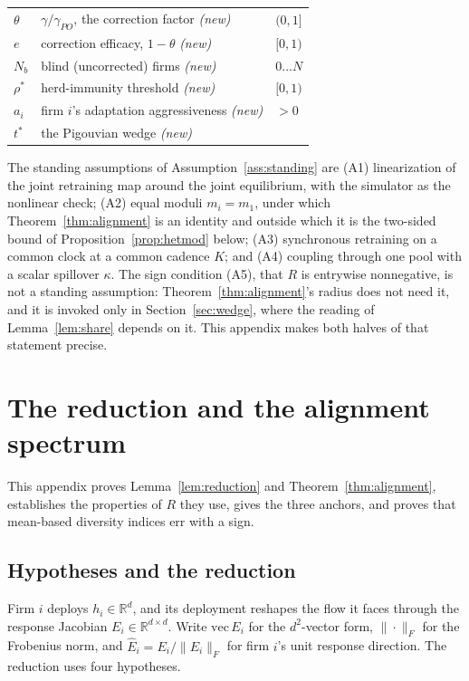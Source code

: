 \begin{center}
\begin{tabular}{lll}
$\theta$ & $\gamma/\gamma_{PO}$, the correction factor \emph{(new)} & $(0,1]$ \\
$e$ & correction efficacy, $1-\theta$ \emph{(new)} & $[0,1)$ \\
$N_b$ & blind (uncorrected) firms \emph{(new)} & $0 \ldots N$ \\
$\rho^\ast$ & herd-immunity threshold \emph{(new)} & $[0,1)$ \\
$a_i$ & firm $i$'s adaptation aggressiveness \emph{(new)} & $>0$ \\
$t^\ast$ & the Pigouvian wedge \emph{(new)} & \\
\bottomrule
\end{tabular}
\end{center}

The standing assumptions of Assumption~\ref{ass:standing} are (A1) linearization of the joint retraining map around the joint equilibrium, with the simulator as the nonlinear check; (A2) equal moduli $m_i = m_1$, under which Theorem~\ref{thm:alignment} is an identity and outside which it is the two-sided bound of Proposition~\ref{prop:hetmod} below; (A3) synchronous retraining on a common clock at a common cadence $K$; and (A4) coupling through one pool with a scalar spillover $\kappa$. The sign condition (A5), that $R$ is entrywise nonnegative, is not a standing assumption: Theorem~\ref{thm:alignment}'s radius does not need it, and it is invoked only in Section~\ref{sec:wedge}, where the reading of Lemma~\ref{lem:share} depends on it. This appendix makes both halves of that statement precise.

\section{The reduction and the alignment spectrum}
\label{app:alignment}

This appendix proves Lemma~\ref{lem:reduction} and Theorem~\ref{thm:alignment}, establishes the properties of $R$ they use, gives the three anchors, and proves that mean-based diversity indices err with a sign.

\subsection{Hypotheses and the reduction}

Firm $i$ deploys $h_i \in \mathbb{R}^d$, and its deployment reshapes the flow it faces through the response Jacobian $E_i \in \mathbb{R}^{d\times d}$. Write $\mathrm{vec}\, E_i$ for the $d^2$-vector form, $\|\cdot\|_F$ for the Frobenius norm, and $\hat{E}_i = E_i/\|E_i\|_F$ for firm $i$'s unit response direction. The reduction uses four hypotheses.

